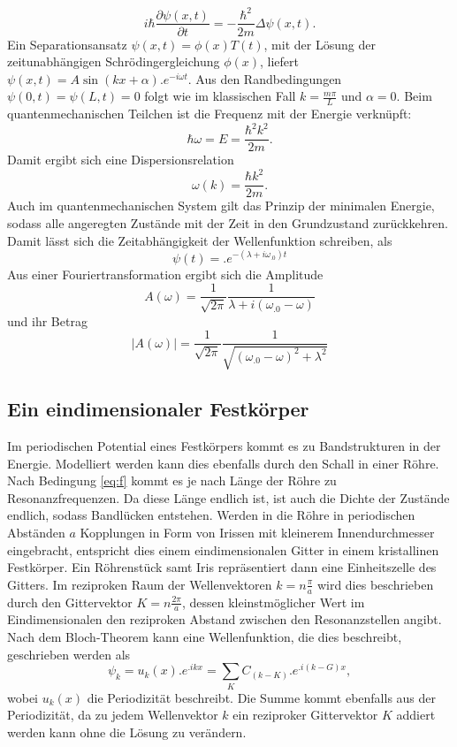 \[
i\hbar\frac{\partial\psi(x,t)}{\partial t}=-\frac{\hbar^2}{2m}\Delta\psi(x,t)\text{.}
\]
Ein Separationsansatz $\psi(x,t)=\phi(x)T(t)$, mit der Lösung der zeitunabhängigen Schrödingergleichung $\phi(x)$, liefert
$\psi(x,t)=A\sin(kx+\alpha) .e^{-i\omega t}$. Aus den Randbedingungen 
$\psi(0,t)=\psi(L,t)=0$ folgt wie im klassischen Fall $k=\frac{m\pi}{L}$ und $\alpha=0$.
Beim quantenmechanischen Teilchen ist die Frequenz mit der Energie verknüpft:
\[
\hbar\omega=E=\frac{\hbar^2k^2}{2m}\text{.}
\]
Damit ergibt sich eine Dispersionsrelation
\begin{equation}
\omega(k)=\frac{\hbar k^2}{2m}\text{.}\label{eq:w_q}
\end{equation}
Auch im quantenmechanischen System gilt das Prinzip der minimalen Energie, sodass alle angeregten Zustände mit der Zeit in den Grundzustand zurückkehren. Damit lässt sich die Zeitabhängigkeit der Wellenfunktion schreiben, als
\[
\psi(t)=.e^{-(\lambda+i\omega_.0)t}
\]
Aus einer Fouriertransformation ergibt sich die Amplitude
\[
A(\omega)=\frac{1}{\sqrt{2\pi}}\frac{1}{\lambda+i(\omega_.0-\omega)}
\]
und ihr Betrag
\begin{equation}
|A(\omega)|=\frac{1}{\sqrt{2\pi}}\frac{1}{\sqrt{(\omega_.0-\omega)^2+\lambda^2}}
\end{equation}

\subsection{Ein eindimensionaler Festkörper}

Im periodischen Potential eines Festkörpers kommt es zu Bandstrukturen in der Energie. Modelliert werden kann dies ebenfalls durch den Schall in einer Röhre. Nach Bedingung \eqref{eq:f} kommt es je nach Länge der Röhre zu Resonanzfrequenzen. Da diese Länge endlich ist, ist auch die Dichte der Zustände endlich, sodass Bandlücken entstehen. Werden in die Röhre in periodischen Abständen $a$ Kopplungen in Form von Irissen mit kleinerem Innendurchmesser eingebracht, entspricht dies einem eindimensionalen Gitter in einem kristallinen Festkörper. Ein Röhrenstück samt Iris repräsentiert dann eine Einheitszelle des Gitters. Im reziproken Raum der Wellenvektoren $k=n\frac{\pi}{a}$ wird dies beschrieben durch den Gittervektor $K=n\frac{2\pi}{a}$, dessen kleinstmöglicher Wert im Eindimensionalen den reziproken Abstand zwischen den Resonanzstellen angibt.
Nach dem Bloch-Theorem kann eine Wellenfunktion, die dies beschreibt, geschrieben werden als
\[
\psi_k=u_k(x) .e^{.i k x}=\sum_K C_{(k-K)} .e^{.i (k-G)x},
\]
wobei $u_k(x)$ die Periodizität beschreibt. Die Summe kommt ebenfalls aus der Periodizität, da zu jedem Wellenvektor $k$ ein reziproker Gittervektor $K$ addiert werden kann ohne die Lösung zu verändern.

